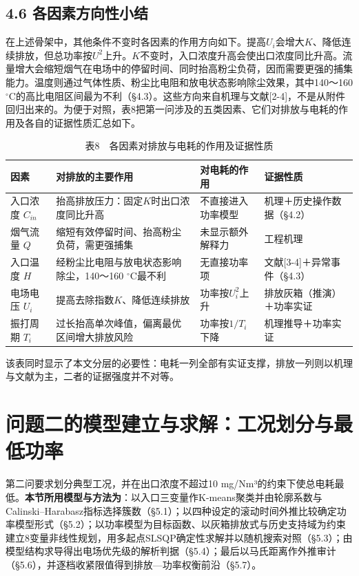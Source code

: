 \documentclass[UTF8,zihao=5,a4paper]{ctexart}
\begin{document}
\subsection*{4.6 各因素方向性小结}

在上述骨架中，其他条件不变时各因素的作用方向如下。提高$U_i$会增大$K$、降低连续排放，但总功率按$U^2$上升。$K$不变时，入口浓度升高会使出口浓度同比升高。流量增大会缩短烟气在电场中的停留时间、同时抬高粉尘负荷，因而需要更强的捕集能力。温度则通过气体性质、粉尘比电阻和放电状态影响除尘效果，其中140～160 $^\circ$C的高比电阻区间最为不利（§4.3）。这些方向来自机理与文献[2-4]，不是从附件回归出来的。为便于对照，表8把第一问涉及的五类因素、它们对排放与电耗的作用及各自的证据性质汇总如下。


\begin{table}[htb]
\centering
\caption*{\normalsize 表8　各因素对排放与电耗的作用及证据性质}
\vspace{-2pt}
\begin{tabularx}{\textwidth}{l>{\hsize=1.270\hsize\raggedright\arraybackslash}X>{\hsize=0.778\hsize\raggedright\arraybackslash}X>{\hsize=0.952\hsize\raggedright\arraybackslash}X}
\toprule
因素 & 对排放的主要作用 & 对电耗的作用 & 证据性质 \\
\midrule
入口浓度 $C_{in}$ & 抬高排放压力：固定$K$时出口浓度同比升高 & 不直接进入功率模型 & 机理＋历史操作数据（§4.2） \\
烟气流量 $Q$ & 缩短有效停留时间、抬高粉尘负荷，需更强捕集 & 未显示额外解释力 & 工程机理 \\
入口温度 $H$ & 经粉尘比电阻与放电状态影响除尘，140～160 $^\circ$C最不利 & 无直接功率项 & 文献[3-4]＋异常事件（§4.3） \\
电场电压 $U_i$ & 提高去除指数$K$、降低连续排放 & 功率按$U_i^2$上升 & 排放灰箱（推演）＋功率实证 \\
振打周期 $T_i$ & 过长抬高单次峰值，偏离最优区间增大排放风险 & 功率按$1/T_i$下降 & 机理推导＋功率实证 \\
\bottomrule
\end{tabularx}
\end{table}

该表同时显示了本文分层的必要性：电耗一列全部有实证支撑，排放一列则以机理与文献为主，二者的证据强度并不对等。

\section{问题二的模型建立与求解：工况划分与最低功率}

第二问要求划分典型工况，并在出口浓度不超过10 mg/Nm³的约束下使总电耗最低。\textbf{本节所用模型与方法为}：以入口三变量作K-means聚类并由轮廓系数与Calinski–Harabasz指标选择簇数（§5.1）；以四种设定的滚动时间外推比较确定功率模型形式（§5.2）；以功率模型为目标函数、以灰箱排放式与历史支持域为约束建立8变量非线性规划，用多起点SLSQP确定性求解并以随机搜索对照（§5.3）；由模型结构求导得出电场优先级的解析判据（§5.4）；最后以马氏距离作外推审计（§5.6），并逐档收紧限值得到排放—功率权衡前沿（§5.7）。
\end{document}
